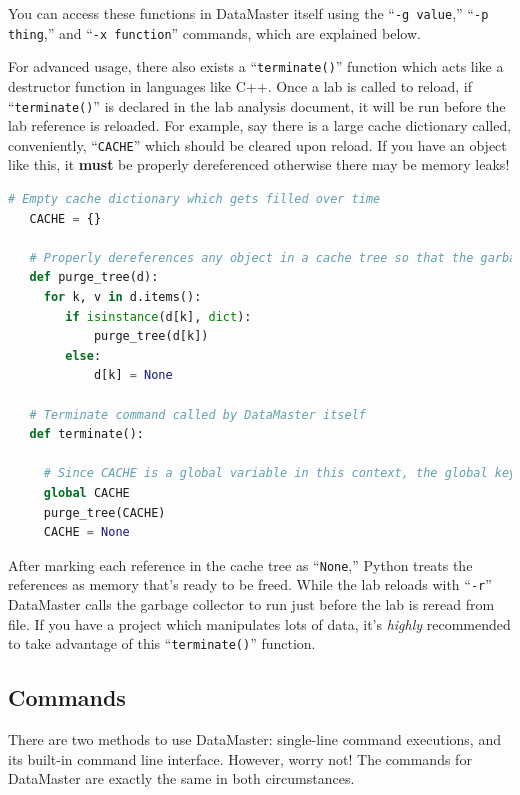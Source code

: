 \documentclass[12pt]{article}
\begin{document}
{You can access these functions in DataMaster itself using the ``\texttt{-g value},'' ``\texttt{-p thing},'' and ``\texttt{-x function}'' commands, which are explained below.

For advanced usage, there also exists a ``\texttt{terminate()}'' function which acts like a destructor function in languages like C++. Once a lab is called to reload, if ``\texttt{terminate()}'' is declared in the lab analysis document, it will be run before the lab reference is reloaded. For example, say there is a large cache dictionary called, conveniently, ``\texttt{CACHE}'' which should be cleared upon reload. If you have an object like this, it \textbf{must} be properly dereferenced otherwise there may be memory leaks!
\begin{framed}
  \begin{lstlisting}[language=Python]
   # Empty cache dictionary which gets filled over time
   CACHE = {}
   
   # Properly dereferences any object in a cache tree so that the garbage collector can free memory
   def purge_tree(d):
     for k, v in d.items():
        if isinstance(d[k], dict):
            purge_tree(d[k])
        else:
            d[k] = None
            
   # Terminate command called by DataMaster itself
   def terminate():
     
     # Since CACHE is a global variable in this context, the global keyword must be used to specify that we're modifying the global
     global CACHE 
     purge_tree(CACHE)
     CACHE = None
  \end{lstlisting}
\end{framed}
After marking each reference in the cache tree as ``\texttt{None},'' Python treats the references as memory that's ready to be freed. While the lab reloads with ``\texttt{-r}'' DataMaster calls the garbage collector to run just before the lab is reread from file. If you have a project which manipulates lots of data, it's \textit{highly} recommended to take advantage of this ``\texttt{terminate()}'' function.

\subsection*{Commands}
\label{subsec:commands}

There are two methods to use DataMaster: single-line command executions, and its built-in command line interface. However, worry not! The commands for DataMaster are exactly the same in both circumstances.

}
\end{document}

